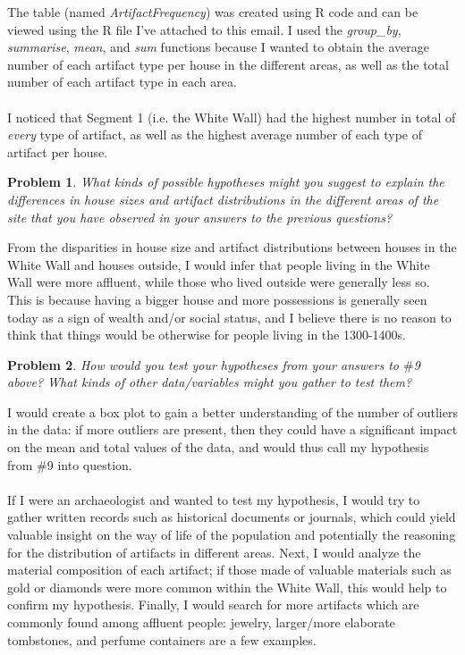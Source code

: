 \documentclass[12pt]{article}
\newtheorem{problem}{Problem}
\begin{document}
 \color{nr}
     The table (named \textit{ArtifactFrequency}) was created using R code and can be viewed using the R file I've attached to this email. I used the \textit{group\_by}, \textit{summarise}, \textit{mean}, and \textit{sum} functions because I wanted to obtain the average number of each artifact type per house in the different areas, as well as the total number of each artifact type in each area. \\
     \\
     I noticed that Segment 1 (i.e. the White Wall) had the highest number in total of \textit{every} type of artifact, as well as the highest average number of each type of artifact per house.
 \color{black}
 \begin{problem}
     What kinds of possible hypotheses might you suggest to explain the differences in house sizes
and artifact distributions in the different areas of the site that you have observed in your
answers to the previous questions?
 \end{problem}
 \color{nr}
     From the disparities in house size and artifact distributions between houses in the White Wall and houses outside, I would infer that people living in the White Wall were more affluent, while those who lived outside were generally less so. This is because having a bigger house and more possessions is generally seen today as a sign of wealth and/or social status, and I believe there is no reason to think that things would be otherwise for people living in the 1300-1400s.
 \color{black}
 \begin{problem}
     How would you test your hypotheses from your answers to $\#$9 above? What kinds of other data/variables might you gather to test them?
 \end{problem}
 \color{nr}
     I would create a box plot to gain a better understanding of the number of outliers in the data: if more outliers are present, then they could have a significant impact on the mean and total values of the data, and would thus call my hypothesis from \#9 into question. \\
     \\
    If I were an archaeologist and wanted to test my hypothesis, I would try to gather written records such as historical documents or journals, which could yield valuable insight on the way of life of the population and potentially the reasoning for the distribution of artifacts in different areas. Next, I would analyze the material composition of each artifact; if those made of valuable materials such as gold or diamonds were more common within the White Wall, this would help to confirm my hypothesis. Finally, I would search for more artifacts which are commonly found among affluent people: jewelry, larger/more elaborate tombstones, and perfume containers are a few examples.
\end{document}
